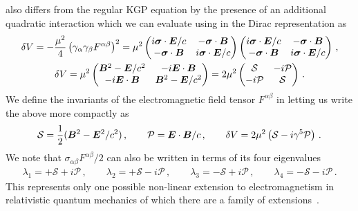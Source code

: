  also differs from the regular KGP equation by the presence of an additional quadratic interaction which we can evaluate using  in the Dirac representation as
\begin{gather}
    \label{quad:1} \delta V=-\frac{\mu^{2}}{4}\left(\gamma_{\alpha}\gamma_{\beta}F^{\alpha\beta}\right)^{2}=\mu^{2}
    \begin{pmatrix}
        i\boldsymbol{\sigma}\cdot\boldsymbol{E}/c & -\boldsymbol{\sigma}\cdot\boldsymbol{B} \\
        -\boldsymbol{\sigma}\cdot\boldsymbol{B} & i\boldsymbol{\sigma}\cdot\boldsymbol{E}/c
    \end{pmatrix}
    \begin{pmatrix}
        i\boldsymbol{\sigma}\cdot\boldsymbol{E}/c & -\boldsymbol{\sigma}\cdot\boldsymbol{B} \\
        -\boldsymbol{\sigma}\cdot\boldsymbol{B} & i\boldsymbol{\sigma}\cdot\boldsymbol{E}/c
    \end{pmatrix}\,,\\
    \label{quad:2}
    \delta V = \mu^{2}
    \begin{pmatrix}
        \boldsymbol{B}^{2}-\boldsymbol{E}/c^{2} & -i\boldsymbol{E}\cdot\boldsymbol{B} \\
        -i\boldsymbol{E}\cdot\boldsymbol{B} & \boldsymbol{B}^{2}-\boldsymbol{E}/c^{2}
    \end{pmatrix}=2\mu^{2}
    \begin{pmatrix}
        \mathcal{S} & -i\mathcal{P} \\
        -i\mathcal{P} & \mathcal{S}
    \end{pmatrix}\,.
\end{gather}
We define the invariants of the electromagnetic field tensor $F^{\alpha\beta}$ in   letting us write the above more compactly as
\begin{alignat}{1}
    \label{inv:1} \mathcal{S}=\frac{1}{2}(\boldsymbol{B}^{2}-\boldsymbol{E}^{2}/c^{2})\,,\qquad
    \mathcal{P}=\boldsymbol{E}\cdot\boldsymbol{B}/c\,,\qquad
    \delta V=2\mu^{2}\left(\mathcal{S}-i\gamma^{5}\mathcal{P}\right)\,.
\end{alignat}
We note that $\sigma_{\alpha\beta}F^{\alpha\beta}/2$ can also be written in terms of its four eigenvalues
\begin{align}
    \label{inv:2}
    \lambda_{1}=+\mathcal{S}+i\mathcal{P}\,,\qquad
    \lambda_{2}=+\mathcal{S}-i\mathcal{P}\,,\qquad
    \lambda_{3}=-\mathcal{S}+i\mathcal{P}\,,\qquad
    \lambda_{4}=-\mathcal{S}-i\mathcal{P}\,.
\end{align}
This represents only one possible non-linear extension to electromagnetism in relativistic quantum mechanics of which there are a family of extensions~\citep{Foldy:1952a}.

